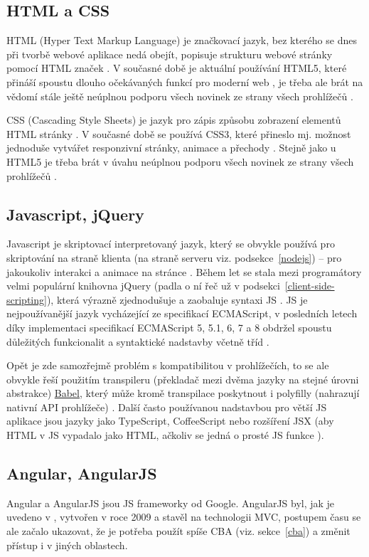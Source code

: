         \subsection{HTML a CSS}
        HTML (Hyper Text Markup Language) je značkovací jazyk, bez kterého se dnes při tvorbě webové aplikace nedá obejít, popisuje strukturu webové stránky pomocí HTML značek \cite{html1}. V současné době je aktuální používání HTML5, které přináší spoustu dlouho očekávaných funkcí pro moderní web \cite{html2}, je třeba ale brát na vědomí stále ještě neúplnou podporu všech novinek ze strany všech prohlížečů \cite{html3}.
        
        CSS (Cascading Style Sheets) je jazyk pro zápis způsobu zobrazení elementů HTML stránky \cite{css2}. V současné době se používá CSS3, které přineslo mj. možnost jednoduše vytvářet responzivní stránky, animace a přechody \cite{css3}. Stejně jako u HTML5 je třeba brát v úvahu neúplnou podporu všech novinek ze strany všech prohlížečů \cite{css1}.
        
        \subsection{Javascript, jQuery}\label{js}
        Javascript je skriptovací interpretovaný jazyk, který se obvykle používá pro skriptování na straně klienta (na straně serveru viz. podsekce~\ref{nodejs}) -- pro jakoukoliv interakci a animace na stránce \cite{js2}. Během let se stala mezi programátory velmi populární knihovna jQuery (padla o ní řeč už v podsekci~\ref{client-side-scripting}), která výrazně zjednodušuje a zaobaluje syntaxi JS \cite{scripting-upwork}. JS je nejpoužívanější jazyk vycházející ze specifikací ECMAScript, v posledních letech díky implementaci specifikací ECMAScript 5, 5.1, 6, 7 a 8 obdržel spoustu důležitých funkcionalit a syntaktické nadstavby včetně tříd \cite{js3}.
        
        Opět je zde samozřejmě problém s kompatibilitou v prohlížečích, to se ale obvykle řeší použitím transpileru (překladač mezi dvěma jazyky na stejné úrovni abstrakce) \href{http://babeljs.io/}{Babel}, který může kromě transpilace poskytnout i polyfilly (nahrazují nativní API prohlížeče) \cite{js4,js1}. Další často používanou nadstavbou pro větší JS aplikace jsou jazyky jako TypeScript, CoffeeScript \cite{js5} nebo rozšíření JSX \cite{js6} (aby HTML v JS vypadalo jako HTML, ačkoliv se jedná o prosté JS funkce \cite{js-fw3}).
        
        \subsection{Angular, AngularJS}\label{sec:angular}
        Angular a AngularJS jsou JS frameworky od Google. AngularJS byl, jak je uvedeno v \cite{angular1}, vytvořen v roce 2009 a stavěl na technologii MVC, postupem času se ale začalo ukazovat, že je potřeba použít spíše CBA (viz. sekce~\ref{cba}) a změnit přístup i v jiných oblastech. 
        
